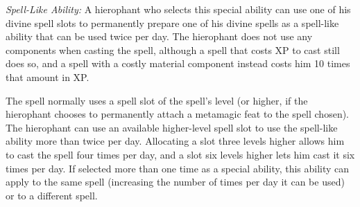 {\textit{Spell-Like Ability:} A hierophant who selects this special ability can use one of his divine spell slots to permanently prepare one of his divine spells as a spell-like ability that can be used twice per day. The hierophant does not use any components when casting the spell, although a spell that costs XP to cast still does so, and a spell with a costly material component instead costs him 10 times that amount in XP.

The spell normally uses a spell slot of the spell's level (or higher, if the hierophant chooses to permanently attach a metamagic feat to the spell chosen). The hierophant can use an available higher-level spell slot to use the spell-like ability more than twice per day. Allocating a slot three levels higher allows him to cast the spell four times per day, and a slot six levels higher lets him cast it six times per day. If selected more than one time as a special ability, this ability can apply to the same spell (increasing the number of times per day it can be used) or to a different spell.
}
